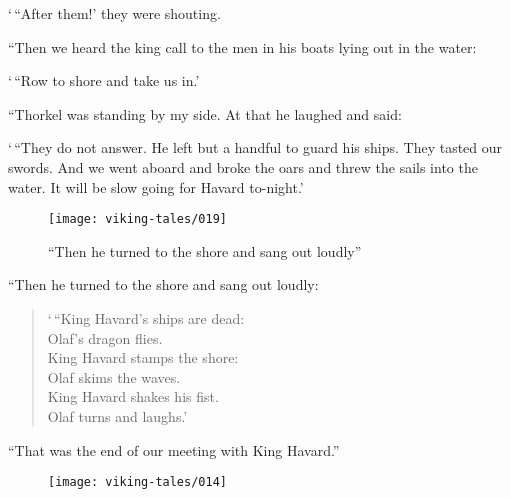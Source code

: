 `\,``After them!' they were shouting.

``Then we heard the king call to the men in his boats lying out in the
water:

`\,``Row to shore and take us in.'

``Thorkel was standing by my side. At that he laughed and said:

`\,``They do not answer. He left but a handful to guard his ships. They
tasted our swords. And we went aboard and broke the oars and threw the
sails into the water. It will be slow going for Havard to-night.'

\begin{figure}
    \centering
    \texttt{[image: viking-tales/019]}
    \caption{``Then he turned to the shore and sang out loudly''}
\end{figure}

``Then he turned to the shore and sang out loudly:

\begin{quote}
`\,``King Havard's ships are dead:\\
Olaf's dragon flies.\\
King Havard stamps the shore:\\
Olaf skims the waves.\\
King Havard shakes his fist.\\
Olaf turns and laughs.'
\end{quote}

``That was the end of our meeting with King Havard.''

\begin{figure}[hb]
    \centering
    \vskip8pt
    \texttt{[image: viking-tales/014]}
\end{figure}
